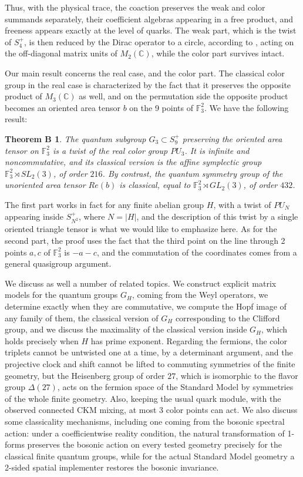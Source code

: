 \documentclass[11pt]{amsart}
\newtheorem*{theoremb}{Theorem B}
\theoremstyle{definition}
\begin{document}
Thus, with the physical trace, the coaction preserves the weak and color summands separately, their coefficient algebras appearing in a free product, and freeness appears exactly at the level of quarks. The weak part, which is the twist of $S_4^+$, is then reduced by the Dirac operator to a circle, according to \cite{bdd}, acting on the off-diagonal matrix units of $M_2(\mathbb C)$, while the color part survives intact.

Our main result concerns the real case, and the color part. The classical color group in the real case is characterized by the fact that it preserves the opposite product of $M_3(\mathbb C)$ as well, and on the permutation side the opposite product becomes an oriented area tensor $b$ on the 9 points of $\mathbb F_3^2$. We have the following result:

\begin{theoremb}
The quantum subgroup $G_3\subset S_9^+$ preserving the oriented area tensor on $\mathbb F_3^2$ is a twist of the real color group $PU_3$. It is infinite and noncommutative, and its classical version is the affine symplectic group $\mathbb F_3^2\rtimes SL_2(3)$, of order $216$. By contrast, the quantum symmetry group of the unoriented area tensor $Re(b)$ is classical, equal to $\mathbb F_3^2\rtimes GL_2(3)$, of order $432$.
\end{theoremb}

The first part works in fact for any finite abelian group $H$, with a twist of $PU_N$ appearing inside $S_{N^2}^+$, where $N=|H|$, and the description of this twist by a single oriented triangle tensor is what we would like to emphasize here. As for the second part, the proof uses the fact that the third point on the line through 2 points $a,c$ of $\mathbb F_3^2$ is $-a-c$, and the commutation of the coordinates comes from a general quasigroup argument.

We discuss as well a number of related topics. We construct explicit matrix models for the quantum groups $G_H$, coming from the Weyl operators, we determine exactly when they are commutative, we compute the Hopf image of any family of them, the classical version of $G_H$ corresponding to the Clifford group, and we discuss the maximality of the classical version inside $G_H$, which holds precisely when $H$ has prime exponent. Regarding the fermions, the color triplets cannot be untwisted one at a time, by a determinant argument, and the projective clock and shift cannot be lifted to commuting symmetries of the finite geometry, but the Heisenberg group of order $27$, which is isomorphic to the flavor group $\Delta(27)$, acts on the fermion space of the Standard Model by symmetries of the whole finite geometry. Also, keeping the usual quark module, with the observed connected CKM mixing, at most 3 color points can act. We also discuss some classicality mechanisms, including one coming from the bosonic spectral action: under a coefficientwise reality condition, the natural transformation of 1-forms preserves the bosonic action on every tested geometry precisely for the classical finite quantum groups, while for the actual Standard Model geometry a 2-sided spatial implementer restores the bosonic invariance.
\end{document}

